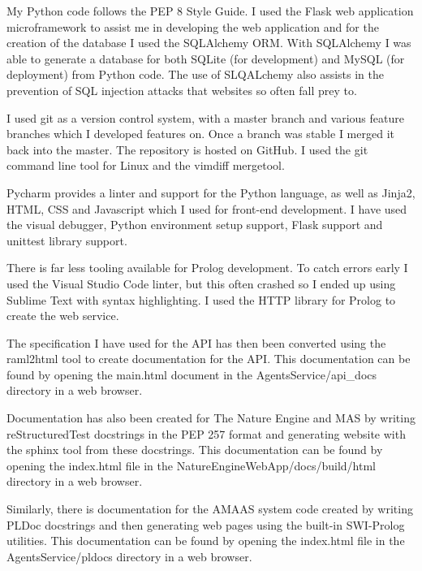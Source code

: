 \documentclass[]{final_report}
\begin{document}
My Python code follows the PEP 8 Style Guide. I used the Flask web application microframework to assist me in developing the web application and for the creation of the database I used the SQLAlchemy ORM. With SQLAlchemy I was able to generate a database for both SQLite (for development) and MySQL (for deployment) from Python code. The use of SLQALchemy also assists in the prevention of SQL injection attacks that websites so often fall prey to.\par 
I used git as a version control system, with a master branch and various feature branches which I developed features on. Once a branch was stable I merged it back into the master. The repository is hosted on GitHub. I used the git command line tool for Linux and the vimdiff mergetool.\par 
Pycharm provides a linter and support for the Python language, as well as Jinja2, HTML, CSS and Javascript which I used for front-end development. I have used the visual debugger, Python environment setup support, Flask support and unittest library support.\par 
There is far less tooling available for Prolog development. To catch errors early I used the Visual Studio Code linter, but this often crashed so I ended up using Sublime Text with syntax highlighting. I used the HTTP library for Prolog to create the web service.\par 
The specification I have used for the API has then been converted using the raml2html tool to create documentation for the API. This documentation can be found by opening the main.html document in the AgentsService/api\_docs directory in a web browser.\par 
Documentation has also been created for The Nature Engine and MAS by writing reStructuredTest docstrings in the PEP 257 format and generating website with the sphinx tool from these docstrings. This documentation can be found by opening the index.html file in the NatureEngineWebApp/docs/build/html directory in a web browser.\par 
Similarly, there is documentation for the AMAAS system code created by writing PLDoc docstrings and then generating web pages using the built-in SWI-Prolog utilities. This documentation can be found by opening the index.html file in the AgentsService/pldocs directory in a web browser.
\end{document}
